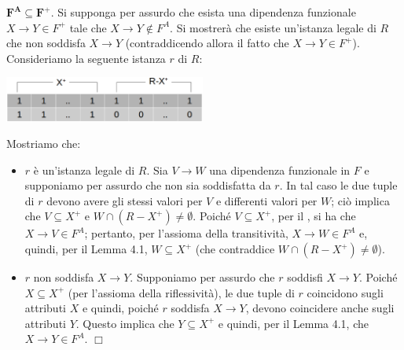 $\mathbf{F^A \boldsymbol{\subseteq} F^{\boldsymbol{+}}}$. Si supponga per assurdo che esista una dipendenza 
funzionale $X \rightarrow Y \in F^+$ tale che $X \rightarrow Y \not\in F^A$. Si mostrerà che esiste 
un'istanza legale di $R$ che non soddisfa $X \rightarrow Y$ (contraddicendo allora il fatto che $X \rightarrow Y 
\in F^+$).\\
Consideriamo la seguente istanza $r$ di $R$:
\begin{center}
\includegraphics[width=250px]{img_4_4_2.eps} 
\end{center}
Mostriamo che:
\begin{itemize}
 \item $r$ è un'istanza legale di $R$. Sia $V \rightarrow W$ una dipendenza funzionale in $F$ e supponiamo
 per assurdo che non sia soddisfatta da $r$. In tal caso le due tuple di $r$ devono avere gli stessi valori
 per $V$ e differenti valori per $W$; ciò implica che $V \subseteq X^+$ e $W \cap (R-X^+)\not = \emptyset$.
 Poiché $V \subseteq X^+$, per il , si ha che $X \rightarrow V \in F^A$; pertanto,
 per l'assioma della transitività, $X \rightarrow W \in F^A$ e, quindi, per il Lemma 4.1,
 $W \subseteq X^+$ (che contraddice $W \cap (R-X^+)\not =\emptyset$).
 \item $r$ non soddisfa $X \rightarrow Y$. Supponiamo per assurdo che $r$ soddisfi $X \rightarrow Y$. Poiché 
 $X \subseteq X^+$ (per l'assioma della riflessività), le due tuple di $r$ coincidono sugli attributi $X$ 
 e quindi, poiché $r$ soddisfa $X \rightarrow Y$, devono coincidere anche sugli attributi $Y$. Questo implica
 che $Y \subseteq X^+$ e quindi, per il Lemma 4.1, che $X \rightarrow Y \in F^A$. \hfill $\Box$
\end{itemize}

